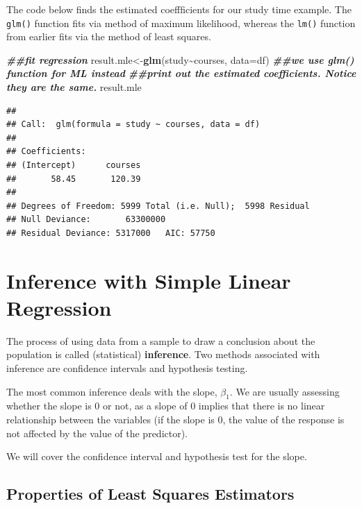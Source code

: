 \documentclass[
]{book}
\newenvironment{Shaded}{\begin{snugshade}}{\end{snugshade}}
\newcommand{\AttributeTok}[1]{\textcolor[rgb]{0.13,0.29,0.53}{#1}}
\newcommand{\DocumentationTok}[1]{\textcolor[rgb]{0.56,0.35,0.01}{\textbf{\textit{#1}}}}
\newcommand{\FunctionTok}[1]{\textcolor[rgb]{0.13,0.29,0.53}{\textbf{#1}}}
\newcommand{\NormalTok}[1]{#1}
\newcommand{\OtherTok}[1]{\textcolor[rgb]{0.56,0.35,0.01}{#1}}
\newcommand{\SpecialCharTok}[1]{\textcolor[rgb]{0.81,0.36,0.00}{\textbf{#1}}}
\begin{document}
The code below finds the estimated coeffficients for our study time example. The \texttt{glm()} function fits via method of maximum likelihood, whereas the \texttt{lm()} function from earlier fits via the method of least squares.

\begin{Shaded}
\begin{Highlighting}[]
\DocumentationTok{\#\#fit regression}
\NormalTok{result.mle}\OtherTok{\textless{}{-}}\FunctionTok{glm}\NormalTok{(study}\SpecialCharTok{\textasciitilde{}}\NormalTok{courses, }\AttributeTok{data=}\NormalTok{df) }\DocumentationTok{\#\#we use glm() function for ML instead}
\DocumentationTok{\#\#print out the estimated coefficients. Notice they are the same. }
\NormalTok{result.mle}
\end{Highlighting}
\end{Shaded}

\begin{verbatim}
## 
## Call:  glm(formula = study ~ courses, data = df)
## 
## Coefficients:
## (Intercept)      courses  
##       58.45       120.39  
## 
## Degrees of Freedom: 5999 Total (i.e. Null);  5998 Residual
## Null Deviance:       63300000 
## Residual Deviance: 5317000   AIC: 57750
\end{verbatim}

\hypertarget{SLRinf}{%
\section{Inference with Simple Linear Regression}\label{SLRinf}}

The process of using data from a sample to draw a conclusion about the population is called (statistical) \textbf{inference}. Two methods associated with inference are confidence intervals and hypothesis testing.

The most common inference deals with the slope, \(\beta_1\). We are usually assessing whether the slope is 0 or not, as a slope of 0 implies that there is no linear relationship between the variables (if the slope is 0, the value of the response is not affected by the value of the predictor).

We will cover the confidence interval and hypothesis test for the slope.

\hypertarget{properties-of-least-squares-estimators}{%
\subsection{Properties of Least Squares Estimators}\label{properties-of-least-squares-estimators}}
\end{document}
